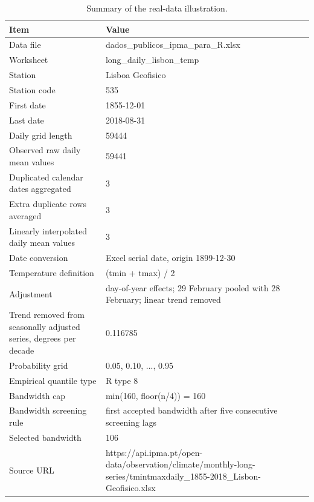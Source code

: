 \begin{table}[!htbp]
\centering
\small
\caption{Summary of the real-data illustration.}
\label{tab:real-data-summary}
\begin{tabular}{ll}
\toprule
Item & Value
 \\
\midrule
Data file & dados\_publicos\_ipma\_para\_R.xlsx
 \\
Worksheet & long\_daily\_lisbon\_temp
 \\
Station & Lisboa Geofisico
 \\
Station code & 535
 \\
First date & 1855-12-01
 \\
Last date & 2018-08-31
 \\
Daily grid length & 59444
 \\
Observed raw daily mean values & 59441
 \\
Duplicated calendar dates aggregated & 3
 \\
Extra duplicate rows averaged & 3
 \\
Linearly interpolated daily mean values & 3
 \\
Date conversion & Excel serial date, origin 1899-12-30
 \\
Temperature definition & (tmin + tmax) / 2
 \\
Adjustment & day-of-year effects; 29 February pooled with 28 February; linear trend removed
 \\
Trend removed from seasonally adjusted series, degrees per decade & 0.116785
 \\
Probability grid & 0.05, 0.10, ..., 0.95
 \\
Empirical quantile type & R type 8
 \\
Bandwidth cap & min(160, floor(n/4)) = 160
 \\
Bandwidth screening rule & first accepted bandwidth after five consecutive screening lags
 \\
Selected bandwidth & 106
 \\
Source URL & https://api.ipma.pt/open-data/observation/climate/monthly-long-series/tmintmaxdaily\_1855-2018\_Lisbon-Geofisico.xlsx
 \\
\bottomrule
\end{tabular}
\end{table}
